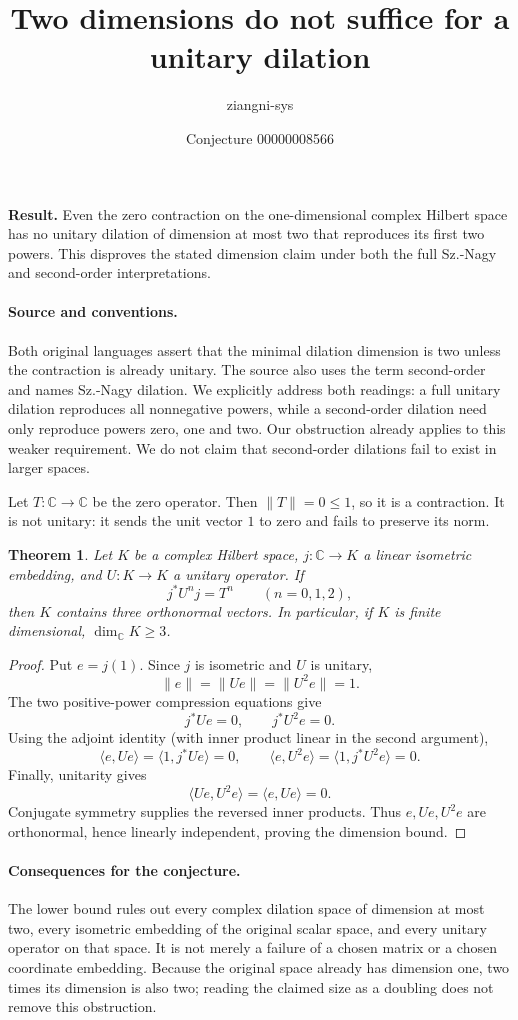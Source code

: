 \documentclass[11pt]{article}
\title{Two dimensions do not suffice for a unitary dilation}
\author{ziangni-sys}
\date{Conjecture 00000008566}
\newtheorem{theorem}{Theorem}
\begin{document}
\raggedright
\maketitle
\noindent\textbf{Result.} Even the zero contraction on the one-dimensional complex Hilbert space has no unitary dilation of dimension at most two that reproduces its first two powers. This disproves the stated dimension claim under both the full Sz.-Nagy and second-order interpretations.

\paragraph{Source and conventions.}
Both original languages assert that the minimal dilation dimension is two unless the contraction is already unitary. The source also uses the term second-order and names Sz.-Nagy dilation. We explicitly address both readings: a full unitary dilation reproduces all nonnegative powers, while a second-order dilation need only reproduce powers zero, one and two. Our obstruction already applies to this weaker requirement. We do not claim that second-order dilations fail to exist in larger spaces.

Let $T:\mathbb C\to\mathbb C$ be the zero operator. Then $\|T\|=0\leq1$, so it is a contraction. It is not unitary: it sends the unit vector $1$ to zero and fails to preserve its norm.

\begin{theorem}
Let $K$ be a complex Hilbert space, $j:\mathbb C\to K$ a linear isometric embedding, and $U:K\to K$ a unitary operator. If
\[
j^*U^n j=T^n\qquad(n=0,1,2),
\]
then $K$ contains three orthonormal vectors. In particular, if $K$ is finite dimensional, $\dim_{\mathbb C}K\geq3$.
\end{theorem}
\begin{proof}
Put $e=j(1)$. Since $j$ is isometric and $U$ is unitary,
\[
\|e\|=\|Ue\|=\|U^2e\|=1.
\]
The two positive-power compression equations give
\[
j^*Ue=0,\qquad j^*U^2e=0.
\]
Using the adjoint identity (with inner product linear in the second argument),
\[
\langle e,Ue\rangle=\langle1,j^*Ue\rangle=0,
\qquad
\langle e,U^2e\rangle=\langle1,j^*U^2e\rangle=0.
\]
Finally, unitarity gives
\[
\langle Ue,U^2e\rangle=\langle e,Ue\rangle=0.
\]
Conjugate symmetry supplies the reversed inner products. Thus $e,Ue,U^2e$ are orthonormal, hence linearly independent, proving the dimension bound.
\end{proof}

\newpage
\paragraph{Consequences for the conjecture.}
The lower bound rules out every complex dilation space of dimension at most two, every isometric embedding of the original scalar space, and every unitary operator on that space. It is not merely a failure of a chosen matrix or a chosen coordinate embedding. Because the original space already has dimension one, two times its dimension is also two; reading the claimed size as a doubling does not remove this obstruction.
\end{document}
